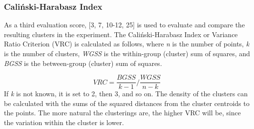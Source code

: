 \subsubsection{Caliński-Harabasz Index}
As a third evaluation score, \textcite{calinskiHarabasz}[3, 7, 10-12, 25] is used to evaluate and compare the resulting clusters in the experiment. 
The Caliński-Harabasz Index or Variance Ratio Criterion (VRC) is calculated as follows, where \textit{n} is the number of points, \textit{k} is the number of clusters, \textit{WGSS} is the within-group (cluster) sum of squares, and \textit{BGSS} is the between-group (cluster) sum of squares.

\[
VRC = \frac{BGSS}{k-1}/\frac{WGSS}{n-k}
\]
If \textit{k} is not known, it is set to 2, then 3, and so on. The density of the clusters can be calculated with the sums of the squared distances from the cluster centroids to the points. The more natural the clusterings are, the higher VRC will be, since the variation within the cluster is lower.